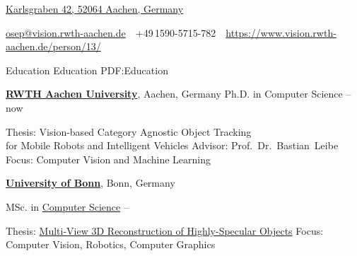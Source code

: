 \documentclass[letterpaper,MMMyyyy,nonstopmode]{simpleresumecv}
\newcommand{\CVAuthor}{Aljoša Ošep}
\newcommand{\CVWebpage}{https://www.vision.rwth-aachen.de/person/13/}
\begin{document}

\Title{\CVAuthor}

\begin{SubTitle}
\href{https://www.google.com/maps/place/Karlsgraben+42,+52064+Aachen}
{Karlsgraben 42, 52064 Aachen, Germany}
\par
\href{mailto:osep@vision.rwth-aachen.de}
{osep@vision.rwth-aachen.de}
\,\SubBulletSymbol\,
+49\,1590-5715-782
\,\SubBulletSymbol\,
\href{\CVWebpage}
{\url{\CVWebpage}}
\end{SubTitle}

\begin{Body}


\Section
{Education}
{Education}
{PDF:Education}


\Entry
\href{http://www.rwth-aachen.de}
{\textbf{RWTH Aachen University}},
Aachen, Germany
\Gap
\BulletItem
Ph.D. in Computer Science
\hfill
{} --
now
\begin{Detail}
\SubBulletItem
Thesis:
{Vision-based Category Agnostic Object Tracking \\for Mobile Robots and Intelligent Vehicles}
\SubBulletItem
Advisor:
Prof.~Dr.~Bastian~Leibe
\SubBulletItem
Focus:
Computer Vision and Machine Learning
\end{Detail}
%



\BigGap
\Entry
\href{https://www.uni-bonn.de/}
{\textbf{University of Bonn}},
Bonn, Germany

\Gap
\BulletItem
MSc. in
\href{https://www.informatik.uni-bonn.de/de/fuer-studierende/master-of-science-in-computer-science}
{Computer Science}
\hfill
{} --
\begin{Detail}
\SubBulletItem
Thesis:
\href{https://www.vision.rwth-aachen.de/media/papers/thesis_doc.pdf}
{Multi-View 3D Reconstruction of Highly-Specular Objects}
\SubBulletItem
Focus:
Computer Vision, Robotics, Computer Graphics
%
\end{Detail}


\end{Body}
\end{document}
